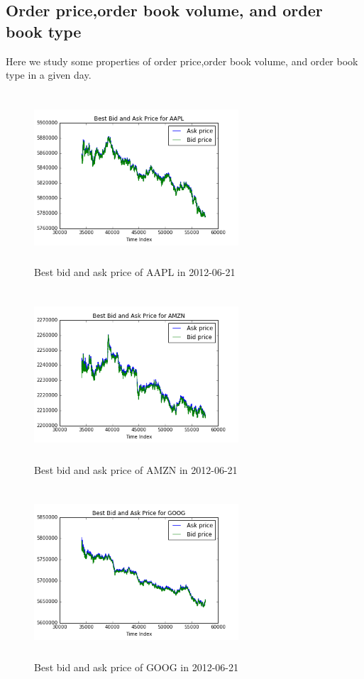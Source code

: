 \subsection{Order price,order book volume, and order book type}
Here we study some properties of order price,order book volume, and order book type in a given day.
\begin{figure}[hbtp]
  \begin{center}
    \includegraphics[width=3in,height=2.5in]{figures/AAPL_price.png}
  \end{center}
\caption{Best bid and ask price of AAPL in 2012-06-21} \label{fig:aapl_price}
\end{figure}
\begin{figure}[hbtp]
  \begin{center}
    \includegraphics[width=3in,height=2.5in]{figures/AMZN_price.png}
  \end{center}
\caption{Best bid and ask price of AMZN in 2012-06-21} \label{fig:amzn_price}
\end{figure}

\begin{figure}[hbtp]
  \begin{center}
    \includegraphics[width=3in,height=2.5in]{figures/GOOG_price.png}
  \end{center}
\caption{Best bid and ask price of GOOG in 2012-06-21} \label{fig:goog_price}
\end{figure}


